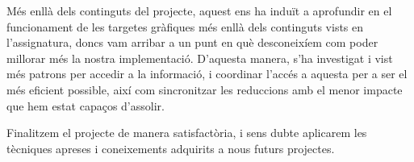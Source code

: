 \documentclass[catalan,10pt,a4paper]{article}
\begin{document}
Més enllà dels continguts del projecte, aquest ens ha induït a aprofundir en el funcionament de les targetes gràfiques més enllà dels continguts vists en l'assignatura, doncs vam arribar a un punt en què desconeixíem com poder millorar més la nostra implementació. D'aquesta manera, s'ha investigat i vist més patrons per accedir a la informació, i coordinar l'accés a aquesta per a ser el més eficient possible, així com sincronitzar les reduccions amb el menor impacte que hem estat capaços d'assolir.

Finalitzem el projecte de manera satisfactòria, i sens dubte aplicarem les tècniques apreses i coneixements adquirits a nous futurs projectes.
\newpage


\end{document}
